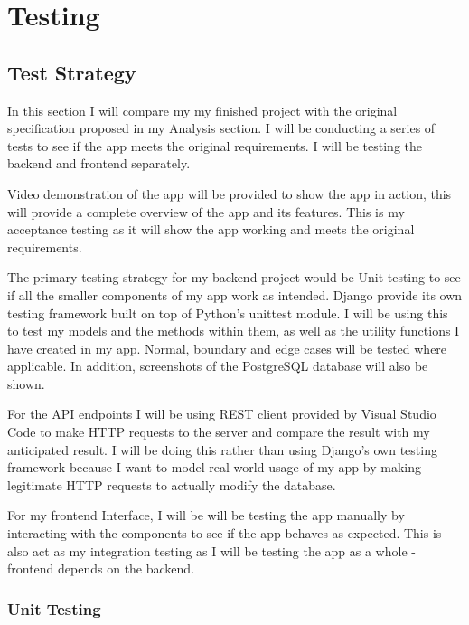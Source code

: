 \chapter{Testing}

\section{Test Strategy}
In this section I will compare my my finished project with the original specification proposed in my Analysis section. I will be conducting a series of tests to see if the app meets the original requirements. I will be testing the backend and frontend separately. 

Video demonstration of the app will be provided to show the app in action, this will provide a complete overview of the app and its features. This is my acceptance testing as it will show the app working and meets the original requirements.

The primary testing strategy for my backend project would be Unit testing to see if all the smaller components of my app work as intended. Django provide its own testing framework built on top of Python's unittest module. I will be using this to test my models and the methods within them, as well as the utility functions I have created in my app. Normal, boundary and edge cases will be tested where applicable. In addition, screenshots of the PostgreSQL database will also be shown.

For the API endpoints I will be using REST client provided by Visual Studio Code to make HTTP requests to the server and compare the result with my anticipated result. I will be doing this rather than using Django's own testing framework because I want to model real world usage of my app by making legitimate HTTP requests to actually modify the database.

For my frontend Interface, I will be will be testing the app manually by interacting with the components to see if the app behaves as expected. This is also act as my integration testing as I will be testing the app as a whole - frontend depends on the backend.

\subsection{Unit Testing}
